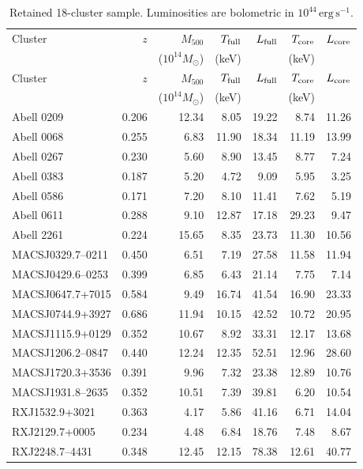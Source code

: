 \documentclass[11pt]{article}
\begin{document}
\begin{longtable}{lrrrrrr}
\caption{Retained 18-cluster sample. Luminosities are bolometric in $10^{44}\,\mathrm{erg\,s^{-1}}$.}\\
\toprule
Cluster & $z$ & $M_{500}$ & $T_{\rm full}$ & $L_{\rm full}$ & $T_{\rm core}$ & $L_{\rm core}$ \\
 & & ($10^{14}M_\odot$) & (keV) & & (keV) & \\
\midrule
\endfirsthead
\toprule
Cluster & $z$ & $M_{500}$ & $T_{\rm full}$ & $L_{\rm full}$ & $T_{\rm core}$ & $L_{\rm core}$ \\
 & & ($10^{14}M_\odot$) & (keV) & & (keV) & \\
\midrule
\endhead
Abell 0209 & 0.206 & 12.34 & 8.05 & 19.22 & 8.74 & 11.26 \\
Abell 0068 & 0.255 & 6.83 & 11.90 & 18.34 & 11.19 & 13.99 \\
Abell 0267 & 0.230 & 5.60 & 8.90 & 13.45 & 8.77 & 7.24 \\
Abell 0383 & 0.187 & 5.20 & 4.72 & 9.09 & 5.95 & 3.25 \\
Abell 0586 & 0.171 & 7.20 & 8.10 & 11.41 & 7.62 & 5.19 \\
Abell 0611 & 0.288 & 9.10 & 12.87 & 17.18 & 29.23 & 9.47 \\
Abell 2261 & 0.224 & 15.65 & 8.35 & 23.73 & 11.30 & 10.56 \\
MACSJ0329.7--0211 & 0.450 & 6.51 & 7.19 & 27.58 & 11.58 & 11.94 \\
MACSJ0429.6--0253 & 0.399 & 6.85 & 6.43 & 21.14 & 7.75 & 7.14 \\
MACSJ0647.7+7015 & 0.584 & 9.49 & 16.74 & 41.54 & 16.90 & 23.33 \\
MACSJ0744.9+3927 & 0.686 & 11.94 & 10.15 & 42.52 & 10.72 & 20.95 \\
MACSJ1115.9+0129 & 0.352 & 10.67 & 8.92 & 33.31 & 12.17 & 13.68 \\
MACSJ1206.2--0847 & 0.440 & 12.24 & 12.35 & 52.51 & 12.96 & 28.60 \\
MACSJ1720.3+3536 & 0.391 & 9.96 & 7.32 & 23.38 & 12.89 & 10.76 \\
MACSJ1931.8--2635 & 0.352 & 10.51 & 7.39 & 39.81 & 6.20 & 10.54 \\
RXJ1532.9+3021 & 0.363 & 4.17 & 5.86 & 41.16 & 6.71 & 14.04 \\
RXJ2129.7+0005 & 0.234 & 4.48 & 6.84 & 18.76 & 7.48 & 8.67 \\
RXJ2248.7--4431 & 0.348 & 12.45 & 12.15 & 78.38 & 12.61 & 40.77 \\
\bottomrule
\end{longtable}



\end{document}
